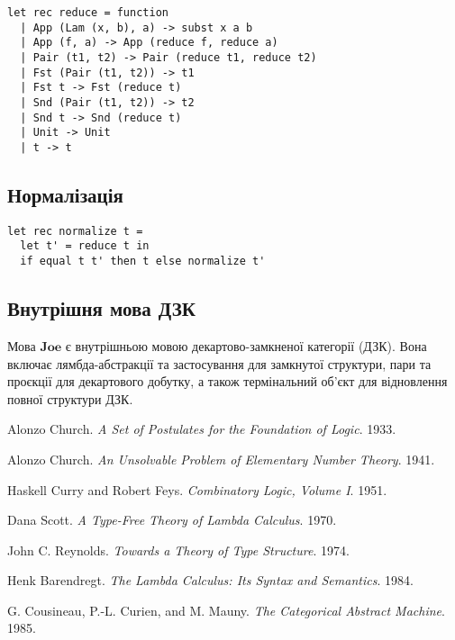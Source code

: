 \documentclass{article}
\theoremstyle{definition}
\begin{document}
\begin{lstlisting}[mathescape=true]
let rec reduce = function
  | App (Lam (x, b), a) -> subst x a b
  | App (f, a) -> App (reduce f, reduce a)
  | Pair (t1, t2) -> Pair (reduce t1, reduce t2)
  | Fst (Pair (t1, t2)) -> t1
  | Fst t -> Fst (reduce t)
  | Snd (Pair (t1, t2)) -> t2
  | Snd t -> Snd (reduce t)
  | Unit -> Unit
  | t -> t
\end{lstlisting}

\subsection{Нормалізація}

\begin{lstlisting}[mathescape=true]
let rec normalize t =
  let t' = reduce t in
  if equal t t' then t else normalize t'
\end{lstlisting}

\subsection{Внутрішня мова ДЗК}

Мова $\mathbf{Joe}$ є внутрішньою мовою декартово-замкненої категорії (ДЗК).
Вона включає лямбда-абстракції та застосування для замкнутої структури,
пари та проєкції для декартового добутку, а також термінальний об’єкт для
відновлення повної структури ДЗК.


\begin{thebibliography}{9}

Alonzo Church.
\textit{A Set of Postulates for the Foundation of Logic}.
1933.

Alonzo Church.
\textit{An Unsolvable Problem of Elementary Number Theory}.
1941.

Haskell Curry and Robert Feys.
\textit{Combinatory Logic, Volume I}.
1951.

Dana Scott.
\textit{A Type-Free Theory of Lambda Calculus}.
1970.

John C. Reynolds.
\textit{Towards a Theory of Type Structure}.
1974.

Henk Barendregt.
\textit{The Lambda Calculus: Its Syntax and Semantics}.
1984.

G. Cousineau, P.-L. Curien, and M. Mauny.
\textit{The Categorical Abstract Machine}.
1985.

\end{thebibliography}
\end{document}

